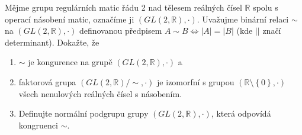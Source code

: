 Mějme grupu regulárních matic řádu 2 nad tělesem reálných čísel $\mathbb{R}$ spolu s operací
násobení matic, označíme ji $(GL(2,\mathbb{R}),\cdot)$. Uvažujme binární relaci
$\sim$ na $(GL(2,\mathbb{R}),\cdot)$ definovanou předpisem $A \sim B
\Leftrightarrow |A| = |B|$ (kde $||$ značí determinant). Dokažte, že
\begin{enumerate}
  \item $\sim$ je kongurence na grupě $(GL(2,\mathbb{R}),\cdot)$ a
  \item faktorová grupa $(GL(2,\mathbb{R})/\sim,\cdot)$ je izomorfní s grupou
  $(\mathbb{R} \setminus \left \{ 0 \right \} ,\cdot )$ všech nenulových
reálných čísel s násobením.
  \item Definujte normální podgrupu grupy $(GL(2,\mathbb{R}),\cdot)$, která
  odpovídá kongruenci $\sim$.
\end{enumerate}
